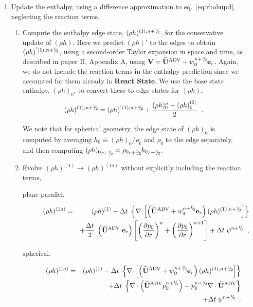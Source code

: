 \begin{description}
\begin{enumerate}
\item Update the enthalpy, using a difference approximation to
  eq.~\ref{eq:rhohupd}, neglecting the reaction terms.

  \begin{enumerate}
  \renewcommand{\labelenumii}{{\bf \roman{enumii}}.}

  \item Compute the enthalpy edge state, $(\rho h)^{(1),\nph}$, for
    the conservative update of $(\rho h)$. Here we predict $(\rho h)'$
    to the edges to obtain $(\rho h)^{'(1),\nph}$, 
    using a second-order Taylor expansion in space and
    time, as described in paper II, Appendix A, using $\Vb =
    \uadvtwo+w_0^{\nph} \er$.  Again, we do not include the reaction
    terms in the enthalpy prediction since we accounted for them
    already in {\bf React State}. We use the base state enthalpy,
    $(\rho h)_0$, to convert these to edge states for $(\rho h)$,
\begin{equation}
(\rho h)^{(1),\nph} = 
(\rho h)^{'(1),\nph} + \frac{(\rho h)_0^n + (\rho h)_0^{(2)}}{2} \enskip .
\end{equation}

   We note that for spherical geometry, the edge state of $(\rho h)_0$
   is computed by averaging $h_0 \equiv (\rho h)_0/\rho_0$ and $\rho_0$
   to the edge separately, and then computing 
   ${(\rho h)_0}_{r+\myhalf} = {\rho_0}_{r+\myhalf} {h_0}_{r+\myhalf}$.
   \item Evolve $(\rho h)^{(1)} \rightarrow (\rho h)^{(1a)}$ without
     explicitly including the reaction terms,

\begin{description}
\item[plane-parallel:]

\begin{eqnarray}
(\rho h)^{(1a)} &=& (\rho h)^{(1)} - \dt \; \left\{ \nablab \cdotb \left[ \left(\uadvtwo+w_0^{\nph} \er\right)  
(\rho h)^{(1),\nph} \right] \right\} \nonumber \\
&& + \frac{\dt}{2} \; \left(\uadvtwo \cdotb \er\right)
\left [ \left(\frac{\partial p_0}{\partial r} \right)^{n}
      + \left(\frac{\partial p_0}{\partial r} \right)^{n+1}  \right ] 
+ \dt \; \psi^{\nph} \enskip ,
\end{eqnarray}

\item[spherical:]

\begin{eqnarray}
(\rho h)^{(1a)} &=& (\rho h)^{(1)} - \dt \; \left\{ \nablab \cdotb \left[ \left(\uadvtwo+w_0^{\nph} \er\right)  
(\rho h)^{(1),\nph} \right] \right\} \nonumber \\
    && + \dt \; \left \{ \nabla \cdot \left (\uadvtwo p_0^{\nph} \right ) 
       - p_0^{\nph} \nabla \cdot \uadvtwo \right \} \nonumber \\
    && + \dt \; \psi^{\nph} \enskip ,
\end{eqnarray}


\end{description}
\end{enumerate}
\end{enumerate}
\end{description}
